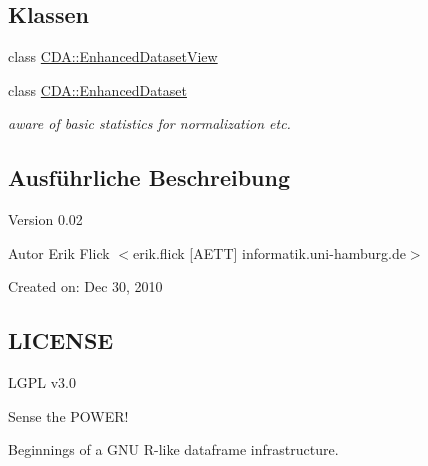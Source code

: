 \subsection*{Klassen}
\begin{DoxyCompactItemize}
\item 
class \hyperlink{classCDA_1_1EnhancedDatasetView}{CDA::EnhancedDatasetView}
\item 
class \hyperlink{classCDA_1_1EnhancedDataset}{CDA::EnhancedDataset}
\begin{DoxyCompactList}\small\item\em aware of basic statistics for normalization etc. \item\end{DoxyCompactList}\end{DoxyCompactItemize}


\subsection{Ausführliche Beschreibung}
\begin{DoxyVersion}{Version}
0.02 
\end{DoxyVersion}
\begin{DoxyAuthor}{Autor}
Erik Flick $<$erik.flick \mbox{[}AETT\mbox{]} informatik.uni-\/hamburg.de$>$
\end{DoxyAuthor}
Created on: Dec 30, 2010\hypertarget{ProbabilisticClustering_8h_09_09_LICENSE}{}\subsection{LICENSE}\label{ProbabilisticClustering_8h_09_09_LICENSE}
LGPL v3.0

Sense the POWER!

Beginnings of a GNU R-\/like dataframe infrastructure. 